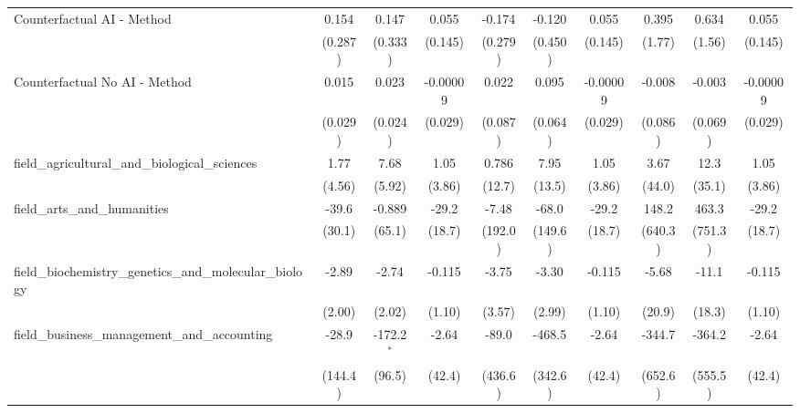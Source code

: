 \begin{tabular}{lccccccccc}
   Counterfactual AI - Method                                  & 0.154         & 0.147         & 0.055         & -0.174         & -0.120        & 0.055         & 0.395   & 0.634     & 0.055\\   
                                                               & (0.287)       & (0.333)       & (0.145)       & (0.279)        & (0.450)       & (0.145)       & (1.77)  & (1.56)    & (0.145)\\   
   Counterfactual No AI - Method                               & 0.015         & 0.023         & -0.00009      & 0.022          & 0.095         & -0.00009      & -0.008  & -0.003    & -0.00009\\   
                                                               & (0.029)       & (0.024)       & (0.029)       & (0.087)        & (0.064)       & (0.029)       & (0.086) & (0.069)   & (0.029)\\   
   field\_agricultural\_and\_biological\_sciences              & 1.77          & 7.68          & 1.05          & 0.786          & 7.95          & 1.05          & 3.67    & 12.3      & 1.05\\   
                                                               & (4.56)        & (5.92)        & (3.86)        & (12.7)         & (13.5)        & (3.86)        & (44.0)  & (35.1)    & (3.86)\\   
   field\_arts\_and\_humanities                                & -39.6         & -0.889        & -29.2         & -7.48          & -68.0         & -29.2         & 148.2   & 463.3     & -29.2\\   
                                                               & (30.1)        & (65.1)        & (18.7)        & (192.0)        & (149.6)       & (18.7)        & (640.3) & (751.3)   & (18.7)\\   
   field\_biochemistry\_genetics\_and\_molecular\_biology      & -2.89         & -2.74         & -0.115        & -3.75          & -3.30         & -0.115        & -5.68   & -11.1     & -0.115\\   
                                                               & (2.00)        & (2.02)        & (1.10)        & (3.57)         & (2.99)        & (1.10)        & (20.9)  & (18.3)    & (1.10)\\   
   field\_business\_management\_and\_accounting                & -28.9         & -172.2$^{*}$  & -2.64         & -89.0          & -468.5        & -2.64         & -344.7  & -364.2    & -2.64\\   
                                                               & (144.4)       & (96.5)        & (42.4)        & (436.6)        & (342.6)       & (42.4)        & (652.6) & (555.5)   & (42.4)\\   

\end{tabular}
